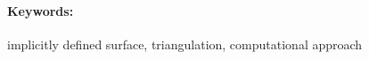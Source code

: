 \documentclass[12pt, twoside]{book}
\begin{document}
\paragraph*{Keywords:} implicitly defined surface, triangulation, computational approach


%
%



\newpage 

\tableofcontents



\newpage 

\listoffigures
\listoftables


\mainmatter


 













\newpage	

\backmatter

\thispagestyle{empty}
\clearpage


 

 
\end{document}
